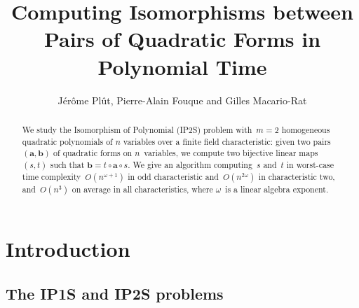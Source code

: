 \documentclass{amsart}
\title[Pairs of quadratic forms]%
{Computing Isomorphisms between Pairs of Quadratic Forms in Polynomial Time}
\author[J. Plût, P.-A. Fouque and G. Macario-Rat]%
{Jérôme Plût, Pierre-Alain Fouque and Gilles Macario-Rat}
\begin{document}
\maketitle
\begin{abstract}%
We study the Isomorphism of Polynomial (IP2S) problem
with~$m=2$ homogeneous quadratic polynomials of $n$ variables over a finite field
characteristic: given two pairs~$(\bm{a}, \bm{b})$
of quadratic forms on $n$~variables,
we compute two bijective linear maps $(s,t)$ such that
$\bm{b}=t\circ \bm{a}\circ s$.
We give an algorithm computing~$s$ and~$t$
in worst-case time complexity~$O(n^{ω+1})$ in odd characteristic
and~$O(n^{2ω})$ in characteristic two,
and~$O(n^3)$ on average in all characteristics,
where $ω$~is a linear algebra exponent.
% 
% 
\end{abstract}%
\maketitle
\section*{Introduction}
\subsection*{The IP1S and IP2S problems}
\end{document}
